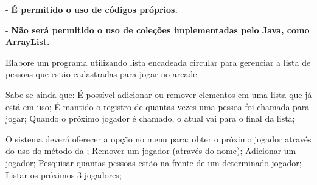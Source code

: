 \documentclass[11pt,a4paper]{article}
\newcommand{\N}{\mathbb{N}}
\begin{document}








\noindent -  {\bf É permitido o uso de códigos próprios.}

\noindent -  {\bf Não será permitido o uso de coleções implementadas pelo Java, como ArrayList.}


%


\begin{outline}[enumerate]
	\1 Elabore um programa utilizando lista encadeada circular para gerenciar a lista de pessoas que estão cadastradas para jogar no arcade.
	
	Sabe-se ainda que: 
	\2 É possível adicionar ou remover elementos em uma lista que já está em uso;
	\2 É mantido o registro de quantas vezes uma pessoa foi chamada para jogar;
	\2 Quando o próximo jogador é chamado, o atual vai para o final da lista;

	\1 O sistema deverá oferecer a opção no menu para:
	\2 obter o próximo jogador através do uso do método  da ;
	\2 Remover um jogador (através do nome);
	\2 Adicionar um jogador;
	\2 Pesquisar quantas pessoas estão na frente de um determinado jogador;
	\2 Listar os próximos 3 jogadores;	
\end{outline}

\begin{flushright}	
\end{flushright}
\end{document}
